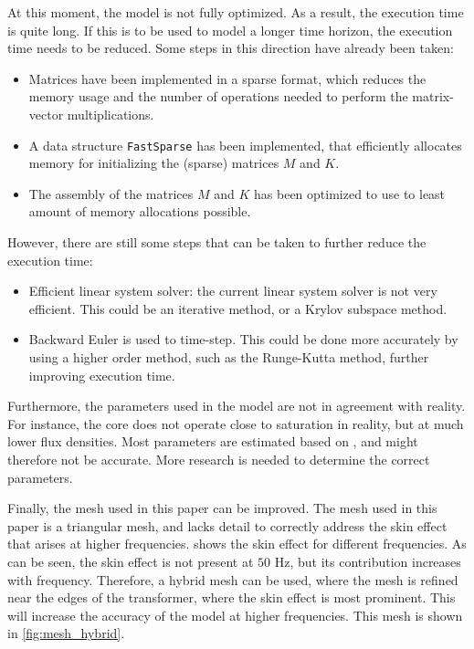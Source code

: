 \vspace{5pt}
\noindent At this moment, the model is not fully optimized. As a result, the execution time is quite long. If this is to be used to model a longer time horizon, the execution time needs to be reduced. Some steps in this direction have already been taken:
\begin{itemize}
    \item Matrices have been implemented in a sparse format, which reduces the memory usage and the number of operations needed to perform the matrix-vector multiplications.
    \item A data structure \verb|FastSparse| has been implemented, that efficiently allocates memory for initializing the (sparse) matrices $M$ and $K$.
    \item The assembly of the matrices $M$ and $K$ has been optimized to use to least amount of memory allocations possible.
\end{itemize}
However, there are still some steps that can be taken to further reduce the execution time:
\begin{itemize}
    \item Efficient linear system solver: the current linear system solver is not very efficient. This could be an iterative method, or a Krylov subspace method.
    \item Backward Euler is used to time-step. This could be done more accurately by using a higher order method, such as the Runge-Kutta method, further improving execution time.
\end{itemize}


\vspace{5pt}
\noindent Furthermore, the parameters used in the model are not in agreement with reality. For instance, the core does not operate close to saturation in reality, but at much lower flux densities. Most parameters are estimated based on \cite{vanDijk2022}, and might therefore not be accurate. More research is needed to determine the correct parameters.

\vspace{5pt}
\noindent Finally, the mesh used in this paper can be improved. The mesh used in this paper is a triangular mesh, and lacks detail to correctly address the skin effect that arises at higher frequencies.  shows the skin effect for different frequencies. As can be seen, the skin effect is not present at $50$ Hz, but its contribution increases with frequency. Therefore, a hybrid mesh can be used, where the mesh is refined near the edges of the transformer, where the skin effect is most prominent. This will increase the accuracy of the model at higher frequencies. This mesh is shown in \cref{fig:mesh_hybrid}.

